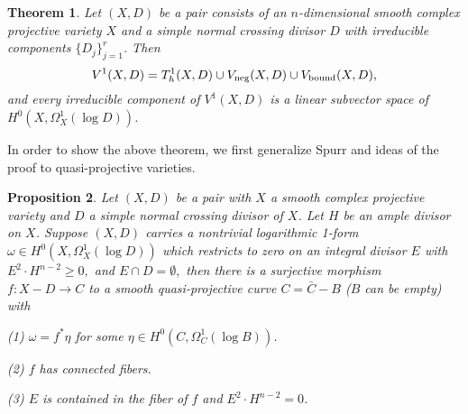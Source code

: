 \documentclass[a4paper,12pt,reqno]{amsart}
\newtheorem{theorem}{Theorem}[section]
\theoremstyle{plain}
\newtheorem{proposition}[theorem]{Proposition}
\theoremstyle{remark}
\begin{document}
\begin{theorem} \label{thm:codim1quasiprojective} Let $(X, D)$ be a pair consists of an $n$-dimensional smooth complex projective variety $X$ and a simple normal crossing divisor $D$ with irreducible components $\{D_j\}_{j=1}^r$. Then 
$$
V^1(X,D)= T^1_h(X, D) \cup V_{\textnormal{neg}}(X, D) \cup V_{\textnormal{bound}}(X, D),
$$
and every irreducible component of $V^1(X,D)$ is a linear subvector space of $H^0(X, \Omega_X^1(\log D))$. 
\end{theorem}

In order to show the above theorem, we first generalize Spurr \cite[Theorem 2]{Sp88} and ideas of the proof to quasi-projective varieties. 

\begin{proposition} \label{Prop:Spurr-no-intersection}
Let $(X, D)$ be a pair with $X$ a smooth complex projective variety and $D$ a simple normal crossing divisor of $X$. Let $H$ be an ample divisor on $X$. Suppose $(X, D)$ carries a nontrivial logarithmic 1-form $\omega\in H^0(X, \Omega_X^1(\log D))$  which restricts to zero on an integral divisor $E$ with $E^2\cdot H^{n-2}\geq0,$ and $E\cap D=\emptyset,$ then there is a surjective morphism $f: X-D\to C$ to a smooth quasi-projective curve $C=\bar{C}-B$ ($B$ can be empty) with 

(1)  $\omega=f^*\eta$ for some $\eta\in H^0(C, \Omega_C^1(\log B))$.

(2) $f$ has connected fibers.

(3) $E$ is contained in the fiber of $f$ and $E^2\cdot H^{n-2}=0$.
\end{proposition}
\end{document}
